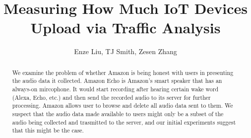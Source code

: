 \documentclass[sigconf,anonymous=false]{acmart}
\begin{document}
\title{Measuring How Much IoT Devices Upload via Traffic Analysis} %
\author{Enze Liu, TJ Smith, Zesen Zhang}


\begin{abstract}
We examine the problem of whether Amazon is being honest with users in presenting the audio data it collected. Amazon Echo is Amazon's smart speaker that has an always-on mircophone. It would start recording after hearing certain wake word (Alexa, Echo, etc.) and then send the recorded audio to its server for further processing. Amazon allows user to browse and delete all audio data sent to them. We suspect that the audio data made available to users might only be a subset of the audio being collected and trasmitted to the server, and our initial experiments suggest that this might be the case.
\end{abstract}




\maketitle




\end{document}

